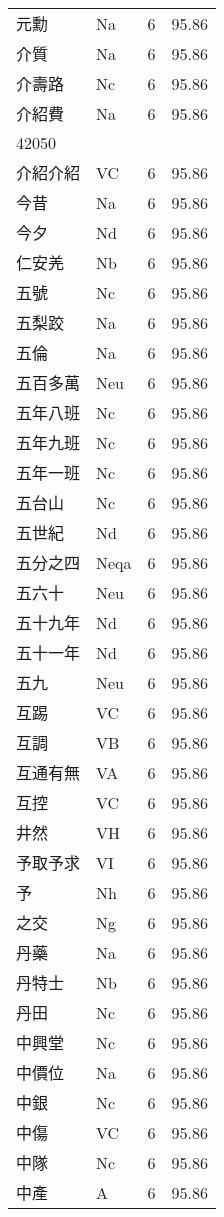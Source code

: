\documentclass[twocolumn]{book}
\begin{document}
\begin{supertabular}{llrr}
元勳 & Na & 6 &  95.86\\
介質 & Na & 6 &  95.86\\
介壽路 & Nc & 6 &  95.86\\
介紹費 & Na & 6 &  95.86\\
42050\\
介紹介紹 & VC & 6 &  95.86\\
今昔 & Na & 6 &  95.86\\
今夕 & Nd & 6 &  95.86\\
仁安羌 & Nb & 6 &  95.86\\
五號 & Nc & 6 &  95.86\\
五梨跤 & Na & 6 &  95.86\\
五倫 & Na & 6 &  95.86\\
五百多萬 & Neu & 6 &  95.86\\
五年八班 & Nc & 6 &  95.86\\
五年九班 & Nc & 6 &  95.86\\
五年一班 & Nc & 6 &  95.86\\
五台山 & Nc & 6 &  95.86\\
五世紀 & Nd & 6 &  95.86\\
五分之四 & Neqa & 6 &  95.86\\
五六十 & Neu & 6 &  95.86\\
五十九年 & Nd & 6 &  95.86\\
五十一年 & Nd & 6 &  95.86\\
五九 & Neu & 6 &  95.86\\
互踢 & VC & 6 &  95.86\\
互調 & VB & 6 &  95.86\\
互通有無 & VA & 6 &  95.86\\
互控 & VC & 6 &  95.86\\
井然 & VH & 6 &  95.86\\
予取予求 & VI & 6 &  95.86\\
予 & Nh & 6 &  95.86\\
之交 & Ng & 6 &  95.86\\
丹藥 & Na & 6 &  95.86\\
丹特士 & Nb & 6 &  95.86\\
丹田 & Nc & 6 &  95.86\\
中興堂 & Nc & 6 &  95.86\\
中價位 & Na & 6 &  95.86\\
中銀 & Nc & 6 &  95.86\\
中傷 & VC & 6 &  95.86\\
中隊 & Nc & 6 &  95.86\\
中產 & A & 6 &  95.86\\

\end{supertabular}
\end{document}
